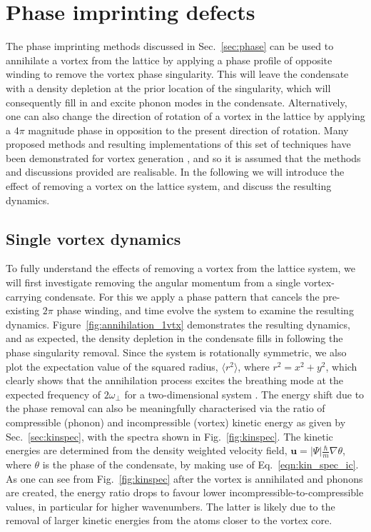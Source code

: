 \section{Phase imprinting defects}\label{sec:phase_def}

The phase imprinting methods discussed in Sec.~\ref{sec:phase} can be used to annihilate a vortex from the lattice by applying a phase profile of opposite winding to remove the vortex phase singularity.  This will leave the condensate with a density depletion at the prior location of the singularity, which will consequently fill in and excite phonon modes in the condensate. Alternatively, one can also change the direction of rotation of a vortex in the lattice by applying a $4\pi$ magnitude phase in opposition to the present direction of rotation. Many proposed methods and resulting implementations of this set of techniques have been demonstrated for vortex generation \cite{Vtx:Dobrek_pra_1999,VTX:Nakahara_physb_2000,VTX:Kawaguchi_pra_2004_2,VTX:Leanhardt_prl_2002,VTX:Kuwamoto_jpsj_2010,VTX:Brachmann_osa_2011}, and so it is assumed that the methods and discussions provided are realisable. In the following we will introduce the effect of removing a vortex on the lattice system, and discuss the resulting dynamics.

\subsection{Single vortex dynamics}

To fully understand the effects of removing a vortex from the lattice system, we will first investigate removing the angular momentum from a single vortex-carrying condensate. For this we apply a phase pattern that cancels the pre-existing $2\pi$ phase winding, and time evolve the system to examine the resulting dynamics. Figure~\ref{fig:annihilation_1vtx} demonstrates the resulting dynamics, and as expected, the density depletion in the condensate fills in following the phase singularity removal. Since the system is rotationally symmetric, we also plot the expectation value of the squared radius, $\langle r^2 \rangle$, where $r^2 = x^2 + y^2$, which clearly shows that the annihilation process excites the breathing mode at the expected frequency of $2\omega_\perp$ for a two-dimensional system \cite{BEC:Pitaevskii_pra_1997,BEC:Watanabe_pra_2007}. The energy shift due to the phase removal can also be meaningfully characterised via the ratio of compressible (phonon) and incompressible (vortex) kinetic energy as given by Sec.~\ref{sec:kinspec}, with the spectra shown in Fig.~\ref{fig:kinspec}. The kinetic energies are determined from the density weighted velocity field, $\mathbf{u} = |\Psi|\frac{\hbar}{m}\nabla \theta$, where $\theta$ is the phase of the condensate, by making use of Eq.~\eqref{eqn:kin_spec_ic}. As one can see from Fig.~\ref{fig:kinspec} after the vortex is annihilated and phonons are created, the energy ratio drops to favour lower incompressible-to-compressible values, in particular for higher wavenumbers. The latter is likely due to the removal of larger kinetic energies from the atoms closer to the vortex core.

